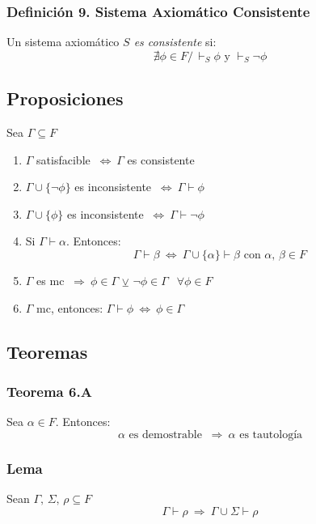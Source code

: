 \documentclass{article}
\newcommand{\comma}{,\,}                                %
\newcommand{\tq}{/\,}                                   %
\newcommand{\Rightarrows}{\: \Rightarrow \:}            %
\newcommand{\Leftrightarrows}{\: \Leftrightarrow \:}    %
\begin{document}
\subsubsection*{Definición 9. Sistema Axiomático Consistente}
Un sistema axiomático \emph{$S$ es consistente} si:
\begin{equation*}
    \nexists \phi \in F \tq \vdash_S \phi \text{ y } \vdash_S \neg \phi
\end{equation*}

\subsection{Proposiciones}
Sea $\Gamma \subseteq F$
\begin{enumerate}
    \item $\Gamma$ satisfacible $\Leftrightarrows \Gamma$ es consistente
    \item $\Gamma \cup \{ \neg \phi \}$ es inconsistente $\Leftrightarrows \Gamma \vdash \phi$
    \item $\Gamma \cup \{ \phi \}$ es inconsistente $\Leftrightarrows \Gamma \vdash \neg \phi$
    \item Si $\Gamma \vdash \alpha$. Entonces:
    \begin{equation*}
        \Gamma \vdash \beta \Leftrightarrows \Gamma \cup \{ \alpha \} \vdash \beta \text{ con } \alpha \comma \beta \in F
    \end{equation*}
    \item $\Gamma$ es mc $\Rightarrows \phi \in \Gamma$ $\veebar$ $\neg \phi \in \Gamma$ $\:\:\forall \phi \in F$ 
    \item $\Gamma$ mc, entonces: $\Gamma \vdash \phi \Leftrightarrows \phi \in \Gamma$
\end{enumerate}


\subsection{Teoremas}
\subsubsection{Teorema 6.A}
Sea $\alpha \in F$. Entonces:
\begin{equation*}
    \alpha \text{ es demostrable } \Rightarrows \alpha \text{ es tautología}
\end{equation*}

\subsubsection{Lema}
Sean $\Gamma \comma \Sigma \comma \rho \subseteq F$
\begin{equation*}
    \Gamma \vdash \rho \Rightarrows \Gamma \cup \Sigma \vdash \rho
\end{equation*}
\end{document}
